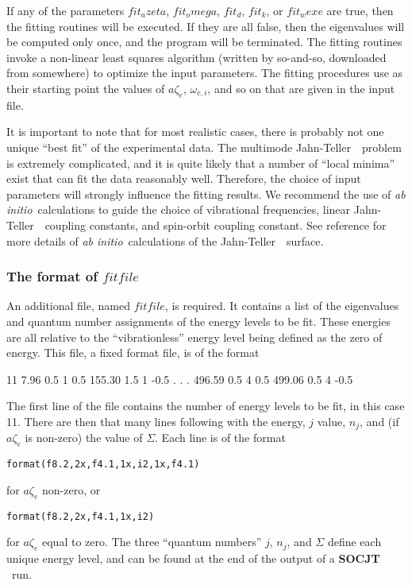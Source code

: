 \documentclass{article}
\newcommand{\ai}{{\it ab initio}}
\newcommand{\JT}{Jahn-Teller\ }
\newcommand{\socjt}{{\bf SOCJT }}
\begin{document}
If any of the parameters $fit_azeta$, $fit_omega$, $fit_d$, $fit_k$,
or $fit_wexe$ are true, then the fitting routines will be executed. If
they are all false, then the eigenvalues will be computed only once,
and the program will be terminated. The fitting routines invoke a
non-linear least squares algorithm (written by so-and-so, downloaded
from somewhere) to optimize the input parameters. The fitting
procedures use as their starting point the values of $a\zeta _e$,
$\omega _{e,i}$, and so on that are given in the input file.

It is important to note that for most realistic cases, there is
probably not one unique ``best fit'' of the experimental data. The
multimode \JT\ problem is extremely complicated, and it is quite
likely that a number of ``local minima'' exist that can fit the data
reasonably well. Therefore, the choice of input parameters will
strongly influence the fitting results. We recommend the use of \ai\
calculations to guide the choice of vibrational frequencies, linear
\JT\ coupling constants, and spin-orbit coupling constant. See
reference  for more details of \ai\ calculations of the
\JT\ surface.

\subsubsection{The format of $fitfile$} \label{section:fitting:file}

An additional file, named $fitfile$, is required. It contains a list
of the eigenvalues and quantum number assignments of the energy levels to
be fit. These energies are all relative to the ``vibrationless''
energy level being defined as the zero of energy. This file, a fixed
format file, is of the format 
\begin{verbatim*}
11
    7.96   0.5  1  0.5
  155.30   1.5  1 -0.5
.
.
.
  496.59   0.5  4  0.5
  499.06   0.5  4 -0.5  
\end{verbatim*}
The first line of the file contains the number of energy levels to be
fit, in this case 11.  There are then that many lines following with
the energy, $j$ value, $n_j$, and (if $a\zeta _e $ is non-zero) the
value of $\Sigma $.  Each line is of the format
\begin{verbatim}
format(f8.2,2x,f4.1,1x,i2,1x,f4.1)
\end{verbatim}
for $a\zeta _e$ non-zero, or
\begin{verbatim}
format(f8.2,2x,f4.1,1x,i2)
\end{verbatim}
for $a\zeta _e$ equal to zero.  The three ``quantum numbers'' $j$,
$n_j$, and $\Sigma $ define each unique energy level, and can be found
at the end of the output of a \socjt\ run.
\end{document}
